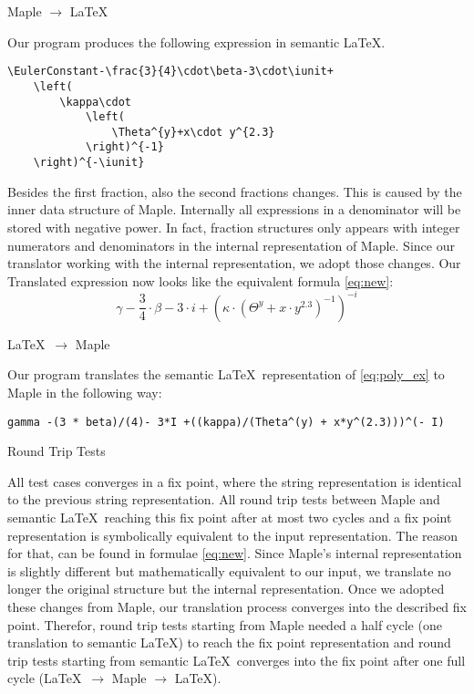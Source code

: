 \documentclass{article}
\newcommand{\iunit}{i}
\newcommand{\EulerConstant}{\gamma}
\begin{document}
\vspace{12pt}
\begin{center}
    \large Maple $\rightarrow$ \LaTeX\\
\end{center}
\noindent Our program produces the following expression in semantic \LaTeX.
\begin{lstlisting}[mathescape]
\EulerConstant-\frac{3}{4}\cdot\beta-3\cdot\iunit+
    \left(
        \kappa\cdot
            \left(
                \Theta^{y}+x\cdot y^{2.3}
            \right)^{-1}
    \right)^{-\iunit}
\end{lstlisting}
\noindent Besides the first fraction, also the second fractions changes. This is caused by the inner data structure of Maple. Internally all expressions in a denominator will be stored with negative power. In fact, fraction structures only appears with integer numerators and denominators in the internal representation of Maple. Since our translator working with the internal representation, we adopt those changes. Our Translated expression now looks like the equivalent formula \ref{eq:new}:
\begin{equation}\label{eq:new}
\EulerConstant-\frac{3}{4}\cdot\beta-3\cdot\iunit+
    \left(
        \kappa\cdot
            \left(
                \Theta^{y}+x\cdot y^{2.3}
            \right)^{-1}
    \right)^{-\iunit}
\end{equation}

\vspace{12pt}
\begin{center}
    \large \LaTeX\ $\rightarrow$ Maple\\
\end{center}
\noindent Our program translates the semantic \LaTeX\ representation of \ref{eq:poly_ex} to Maple in the following way:
\begin{lstlisting}[mathescape]
gamma -(3 * beta)/(4)- 3*I +((kappa)/(Theta^(y) + x*y^(2.3)))^(- I)
\end{lstlisting}
\newpage
\begin{center}
    \large Round Trip Tests
\end{center}
All test cases converges in a fix point, where the string representation is identical to the previous string representation. All round trip tests between Maple and semantic \LaTeX\ reaching this fix point after at most two cycles and a fix point representation is symbolically equivalent to the input representation. The reason for that, can be found in formulae \ref{eq:new}. Since Maple's internal representation is slightly different but mathematically equivalent to our input, we translate no longer the original structure but the internal representation. Once we adopted these changes from Maple, our translation process converges into the described fix point. Therefor, round trip tests starting from Maple needed a half cycle (one translation to semantic \LaTeX) to reach the fix point representation and round trip tests starting from semantic \LaTeX\ converges into the fix point after one full cycle (\LaTeX\ $\rightarrow$ Maple $\rightarrow$ \LaTeX).
\end{document}
